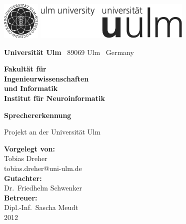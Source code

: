 \documentclass[a4paper,10pt,bibliography=totoc,oneside,openright,numbers=noenddot,headings=normal,DIV=9
]{scrreprt}
\makeatletter
\newcommand{\fullname}{Tobias Dreher}
\newcommand{\email}{tobias.dreher@uni-ulm.de}
\newcommand{\titel}{Sprechererkennung}
\newcommand{\jahr}{2012}
\newcommand{\gutachterA}{Dr.\ Friedhelm Schwenker}
\newcommand{\betreuer}{Dipl.-Inf.\ Sascha Meudt}
\newcommand{\fakultaet}{Ingenieurwissenschaften\\und Informatik}
\newcommand{\institut}{Institut für Neuroinformatik}
\makeatother
\begin{document}

\thispagestyle{empty}
\begin{addmargin*}[4mm]{-32mm}

\includegraphics[height=1.8cm]{images/unilogo_bild}
\hfill
\includegraphics[height=1.8cm]{images/unilogo_wort}
\vspace*{2.1em}

{\footnotesize
{\bfseries Universität Ulm} \textbar ~89069 Ulm \textbar ~Germany
\hfill\parbox[t]{42mm}{\bfseries Fakultät für\\
\fakultaet\\
\mdseries \institut}
\vspace*{2cm}

\parbox{140mm}{\bfseries \huge \titel}

{\footnotesize Projekt an der Universität Ulm}
\vspace*{4em}

{\footnotesize
{\bfseries Vorgelegt von:}\\
\fullname\\\email\\[2em]
{\bfseries Gutachter:}\\
\gutachterA\\
[2em] %
{\bfseries Betreuer:}\\
\betreuer
\\[1.5em]
\jahr}
}
\end{addmargin*}
\end{document}
